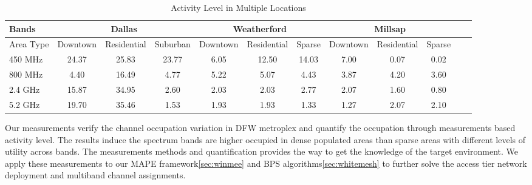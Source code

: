 \begin{table}
\centering %
\begin{tabular}{|l|c|c|c|c|c|c|c|c|c|c|c|} %
\hline %
Bands     & \multicolumn{3}{c|}{Dallas} & \multicolumn{3}{c|}{Weatherford} & \multicolumn{3}{c|}{Millsap} \\%
\hline %
Area Type & Downtown & Residential & Suburban & Downtown &  Residential & Sparse & Downtown & Residential & Sparse \\ %
\hline %
450 MHz &24.37	&25.83  &23.77	&6.05 &12.50  &14.03 & 7.00 & 0.07 & 0.02 \\      
\hline %
800 MHz &4.40 	&16.49  &4.77	&5.22&5.07 &4.43  & 3.87 & 4.20 & 3.60 \\      
\hline %
2.4 GHz &15.87 	&34.95  &2.60	&2.03&2.03 &2.77  & 2.07 & 1.60 & 0.80 \\      
\hline %
5.2 GHz &19.70	&35.46  &1.53	&1.93&1.93 &1.33  & 1.27 & 2.07 & 2.10 \\      
\hline %
\end{tabular}    
\caption{Activity Level in Multiple Locations} %
\label{tab:activitymeasurement}    
\vspace{-0.3in}
\end{table}    


Our measurements verify the channel occupation variation in DFW metroplex and quantify the occupation
through measurements based activity level. The results induce the spectrum bands are higher occupied in
dense populated areas than sparse areas with different levels of utility across bands. The measurements 
methods and quantification provides the way to get the knowledge of the target environment. We apply these 
measurements to our MAPE framework\ref{sec:winmee} and BPS algorithms\ref{sec:whitemesh} to further solve the 
access tier network deployment and multiband channel assignments.
